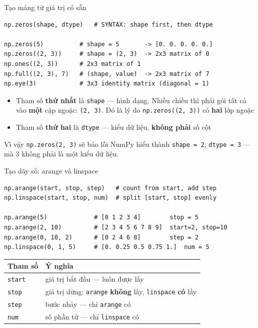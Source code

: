 \documentclass[11pt]{beamer}
\begin{document}
\begin{frame}[fragile]{Tạo mảng từ giá trị có sẵn}
\begin{lstlisting}
np.zeros(shape, dtype)   # SYNTAX: shape first, then dtype

np.zeros(5)          # shape = 5       -> [0. 0. 0. 0. 0.]
np.zeros((2, 3))     # shape = (2, 3)  -> 2x3 matrix of 0
np.ones((2, 3))      # 2x3 matrix of 1
np.full((2, 3), 7)   # (shape, value)  -> 2x3 matrix of 7
np.eye(3)            # 3x3 identity matrix (diagonal = 1)
\end{lstlisting}
\begin{itemize}
  \item Tham số \textbf{thứ nhất} là \texttt{shape} --- hình dạng. Nhiều chiều thì phải gói tất cả
        vào \textbf{một} cặp ngoặc: \texttt{(2, 3)}. Đó là lý do \texttt{np.zeros((2, 3))} có \textbf{hai} lớp ngoặc
  \item Tham số \textbf{thứ hai} là \texttt{dtype} --- kiểu dữ liệu, \textbf{không phải} số cột
\end{itemize}
\begin{alertblock}{Vì vậy \texttt{np.zeros(2, 3)} sẽ báo lỗi}
NumPy hiểu thành \texttt{shape = 2}, \texttt{dtype = 3} --- mà 3 không phải là một kiểu dữ liệu.
\end{alertblock}
\end{frame}

\begin{frame}[fragile]{Tạo dãy số: arange và linspace}
\begin{lstlisting}
np.arange(start, stop, step)   # count from start, add step
np.linspace(start, stop, num)  # split [start, stop] evenly

np.arange(5)             # [0 1 2 3 4]        stop = 5
np.arange(2, 10)         # [2 3 4 5 6 7 8 9]  start=2, stop=10
np.arange(0, 10, 2)      # [0 2 4 6 8]        step = 2
np.linspace(0, 1, 5)     # [0. 0.25 0.5 0.75 1.]  num = 5
\end{lstlisting}
\begin{center}
\small
\begin{tabular}{|l|l|}
\hline
\textbf{Tham số} & \textbf{Ý nghĩa} \\
\hline
\texttt{start} & giá trị bắt đầu --- luôn được lấy \\
\texttt{stop}  & giá trị dừng: \texttt{arange} \textbf{không} lấy, \texttt{linspace} \textbf{có} lấy \\
\texttt{step}  & bước nhảy --- chỉ \texttt{arange} có \\
\texttt{num}   & số phần tử --- chỉ \texttt{linspace} có \\
\hline
\end{tabular}
\end{center}
\end{frame}
\end{document}
